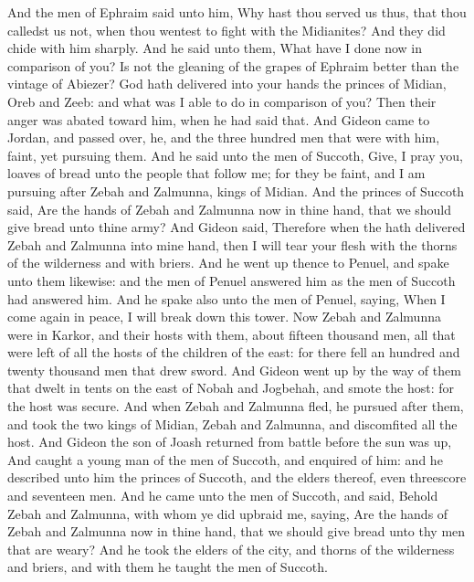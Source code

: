 \begin{biblechapter} %
 And the men of Ephraim said unto him, Why hast thou served us thus, that thou calledst us not, when thou wentest to fight with the Midianites? And they did chide with him sharply.
\verse And he said unto them, What have I done now in comparison of you? Is not the gleaning of the grapes of Ephraim better than the vintage of Abiezer?
\verse God hath delivered into your hands the princes of Midian, Oreb and Zeeb: and what was I able to do in comparison of you? Then their anger was abated toward him, when he had said that.
\verse And Gideon came to Jordan, and passed over, he, and the three hundred men that were with him, faint, yet pursuing them.
\verse And he said unto the men of Succoth, Give, I pray you, loaves of bread unto the people that follow me; for they be faint, and I am pursuing after Zebah and Zalmunna, kings of Midian.
\verse And the princes of Succoth said, Are the hands of Zebah and Zalmunna now in thine hand, that we should give bread unto thine army?
\verse And Gideon said, Therefore when the \LORD hath delivered Zebah and Zalmunna into mine hand, then I will tear your flesh with the thorns of the wilderness and with briers.
\verse And he went up thence to Penuel, and spake unto them likewise: and the men of Penuel answered him as the men of Succoth had answered him.
\verse And he spake also unto the men of Penuel, saying, When I come again in peace, I will break down this tower.
\verse Now Zebah and Zalmunna were in Karkor, and their hosts with them, about fifteen thousand men, all that were left of all the hosts of the children of the east: for there fell an hundred and twenty thousand men that drew sword.
\verse And Gideon went up by the way of them that dwelt in tents on the east of Nobah and Jogbehah, and smote the host: for the host was secure.
\verse And when Zebah and Zalmunna fled, he pursued after them, and took the two kings of Midian, Zebah and Zalmunna, and discomfited all the host.
\verse And Gideon the son of Joash returned from battle before the sun was up,
\verse And caught a young man of the men of Succoth, and enquired of him: and he described unto him the princes of Succoth, and the elders thereof, even threescore and seventeen men.
\verse And he came unto the men of Succoth, and said, Behold Zebah and Zalmunna, with whom ye did upbraid me, saying, Are the hands of Zebah and Zalmunna now in thine hand, that we should give bread unto thy men that are weary?
\verse And he took the elders of the city, and thorns of the wilderness and briers, and with them he taught the men of Succoth.

\end{biblechapter}
